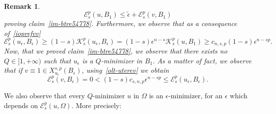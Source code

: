 \documentclass[12pt]{article}
\numberwithin{equation}{section}
\newtheorem{rem}[thm]{Remark}
\renewcommand{\leq}{\leqslant}
\renewcommand{\geq}{\geqslant}
\begin{document}
\begin{rem}
\begin{equation*}
\mathcal{E}_s^p(u,B_1)\leq \tilde{\epsilon}+\mathcal{E}_s^p(v,B_1)
\end{equation*}
proving claim~\eqref{im-btre54778}. Furthermore, we observe that as a consequence of~\eqref{ioprefvv} 
\begin{equation}\label{olt-uterev}
\mathcal{E}_s^p(u_\epsilon,B_\epsilon)\geq (1-s)\mathcal{K}_s^p(u_\epsilon,B_\epsilon)=(1-s)\epsilon^{n-s} \mathcal{K}_s^p(u,B_1)\geq c_{n,s,p}(1-s)\epsilon^{n-sp}.
\end{equation} 
Now, that we proved claim~\eqref{im-btre54778}, we observe that there exists no $Q\in [1,+\infty)$ such that $u_\epsilon$ is a $Q$-minimizer in $B_1$. As a matter of fact, we observe that if $v\equiv 1\in X_{u_\epsilon}^{s,p}(B_\epsilon)$, using~\eqref{olt-uterev} we obtain 
\begin{equation*}
\mathcal{E}_s^p(v,B_\epsilon)=0< (1-s)c_{s,n,p}\epsilon^{n-sp}\leq \mathcal{E}_s^p(u_\epsilon,B_\epsilon). 
\end{equation*}
\end{rem}
We also observe that every $Q$-minimizer $u$ in $\Omega$ is an $\epsilon$-minimizer, for an $\epsilon$ which depends on $\mathcal{E}_s^p(u,\Omega)$. More precisely: 
\end{document}
